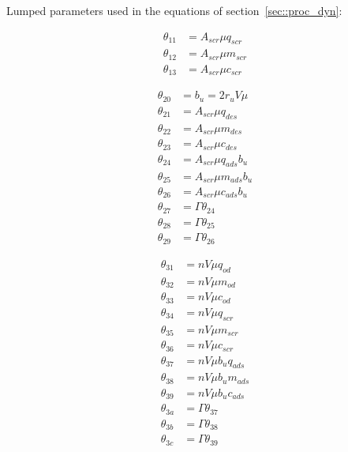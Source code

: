 Lumped parameters used in the equations of section~\ref{sec::proc_dyn}:

\begin{minipage}{0.32\textwidth}
    \begin{align*}
        \theta_{11} &= A_{scr} \mu q_{scr} \\
        \theta_{12} &= A_{scr} \mu m_{scr} \\
        \theta_{13} &= A_{scr} \mu c_{scr}
    \end{align*}
\end{minipage}
\begin{minipage}{0.32 \textwidth}
    \begin{align*}
    \theta_{20} &= b_u = 2 r_u V \mu \\
    \theta_{21} &= A_{scr} \mu q_{des}\\
    \theta_{22} &= A_{scr} \mu m_{des}\\
    \theta_{23} &= A_{scr} \mu c_{des}\\
    \theta_{24} &= A_{scr} \mu q_{ads}b_u\\
    \theta_{25} &= A_{scr} \mu m_{ads}b_u\\
    \theta_{26} &= A_{scr} \mu c_{ads} b_u\\
    \theta_{27} &= \Gamma \theta_{24}\\
    \theta_{28} &= \Gamma \theta_{25}\\
    \theta_{29} &= \Gamma \theta_{26}
    \end{align*}
\end{minipage}
\begin{minipage}{0.32 \textwidth}
    \begin{align*}
    \theta_{31} &= n V \mu q_{od}\\
    \theta_{32} &= n V \mu m_{od} \\
    \theta_{33} &= n V \mu c_{od} \\
    \theta_{34} &= n V \mu q_{scr} \\
    \theta_{35} &= n V \mu m_{scr} \\
    \theta_{36} &= n V \mu c_{scr} \\
    \theta_{37} &= n V \mu b_u q_{ads} \\
    \theta_{38} &= n V \mu b_u m_{ads} \\
    \theta_{39} &= n V \mu b_u c_{ads}\\
    \theta_{3a} &= \Gamma \theta_{37}\\
    \theta_{3b} &= \Gamma \theta_{38}\\
    \theta_{3c} &= \Gamma \theta_{39}
    \end{align*}
\end{minipage}
